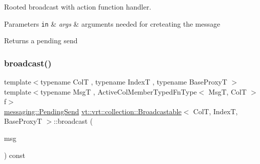 Rooted broadcast with action function handler. 


\begin{DoxyParams}[1]{Parameters}
\mbox{\tt in}  & {\em args} & arguments needed for creteating the message\\
\hline
\end{DoxyParams}
\begin{DoxyReturn}{Returns}
a pending send 
\end{DoxyReturn}
\mbox{\label{structvt_1_1vrt_1_1collection_1_1_broadcastable_a0a08e1ab7c78e36b3ecb5b6a4d399dab}} 
\subsubsection{\texorpdfstring{broadcast()}{broadcast()}\hspace{0.1cm}{\footnotesize\ttfamily [4/6]}}
{\footnotesize\ttfamily template$<$typename ColT , typename IndexT , typename Base\+ProxyT $>$ \\
template$<$typename MsgT , Active\+Col\+Member\+Typed\+Fn\+Type$<$ Msg\+T, Col\+T $>$ f$>$ \\
\hyperlink{structvt_1_1messaging_1_1_pending_send}{messaging\+::\+Pending\+Send} \hyperlink{structvt_1_1vrt_1_1collection_1_1_broadcastable}{vt\+::vrt\+::collection\+::\+Broadcastable}$<$ ColT, IndexT, Base\+ProxyT $>$\+::broadcast (\begin{DoxyParamCaption}\item[{MsgT $\ast$}]{msg }\end{DoxyParamCaption}) const}

\mbox{\label{structvt_1_1vrt_1_1collection_1_1_broadcastable_a84e88085c04b2293e019faf986a4996a}} 
